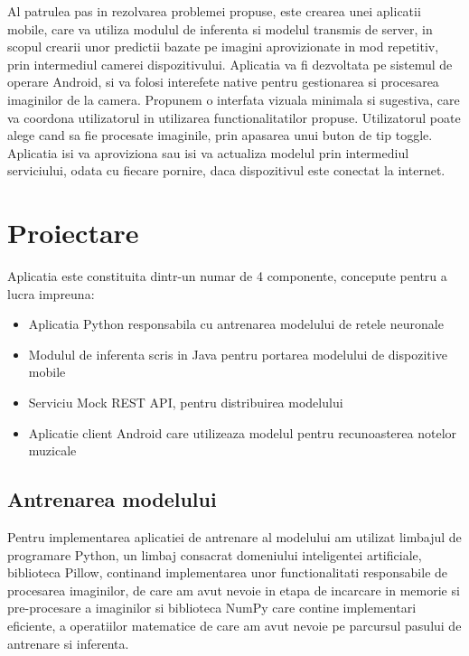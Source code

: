 	Al patrulea pas in rezolvarea problemei propuse, este crearea unei aplicatii mobile, care va utiliza modulul de inferenta si modelul transmis de server, in scopul crearii unor predictii bazate pe imagini aprovizionate in mod repetitiv, prin intermediul camerei dispozitivului.  
	Aplicatia va fi dezvoltata pe sistemul de operare Android, si va folosi interefete native pentru gestionarea si procesarea imaginilor de la camera. 
	Propunem o interfata vizuala minimala si sugestiva, care va coordona utilizatorul in utilizarea functionalitatilor propuse. Utilizatorul poate alege cand sa fie procesate imaginile, prin apasarea unui buton de tip toggle. 
	Aplicatia isi va aproviziona sau isi va actualiza modelul prin intermediul serviciului, odata cu fiecare pornire, daca dispozitivul este conectat la internet. 

	\section{Proiectare}
	
	Aplicatia este constituita dintr-un numar de 4 componente, concepute pentru a lucra impreuna: 
	
	\begin{itemize}	
	\item	Aplicatia Python responsabila cu  antrenarea modelului de retele neuronale
	\item	Modulul de inferenta scris in Java pentru portarea modelului de dispozitive mobile
	\item	Serviciu Mock REST API, pentru distribuirea modelului
	\item	Aplicatie client Android care utilizeaza modelul pentru recunoasterea notelor muzicale
	\end{itemize}
	
	\subsection{Antrenarea modelului}
	
	Pentru implementarea aplicatiei de antrenare al modelului am utilizat limbajul de programare Python, un limbaj consacrat domeniului inteligentei artificiale, biblioteca Pillow, continand implementarea unor functionalitati responsabile de procesarea imaginilor, de care am avut nevoie in etapa de incarcare in memorie si pre-procesare a imaginilor si biblioteca NumPy care contine implementari eficiente, a operatiilor matematice de care am avut nevoie pe parcursul pasului de antrenare si inferenta. 
	
